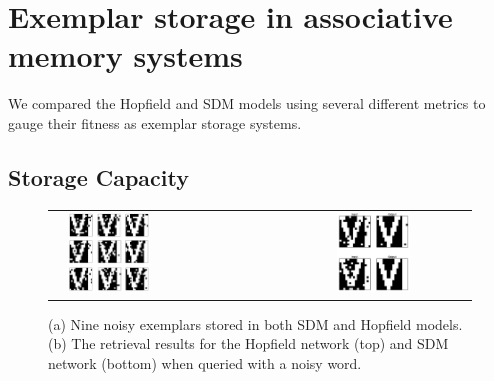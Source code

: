 \documentclass[10pt,letterpaper]{article}
\begin{document}
\section{Exemplar storage in associative memory systems}

We compared the Hopfield and SDM models using several different
metrics to gauge their fitness as exemplar storage systems.

\subsection{Storage Capacity}

\begin{figure}[t!]
  \begin{center}
    \begin{tabular}{ l l l c}
      \raisebox{2.5in}{(a)} &
      \includegraphics[width=0.43\textwidth]{./figures/exemplars.png} &
      \raisebox{2.5in}{(b)} &
      \includegraphics[width=0.4\textwidth]{./figures/prototypeResults.png} \\
    \end{tabular}
    \caption{(a) Nine noisy exemplars stored in both SDM and Hopfield
      models. (b) The retrieval results for the Hopfield network (top)
      and SDM network (bottom) when queried with a noisy word.}
    \label{fig:prototypes}
  \end{center}
\end{figure}
\end{document}
